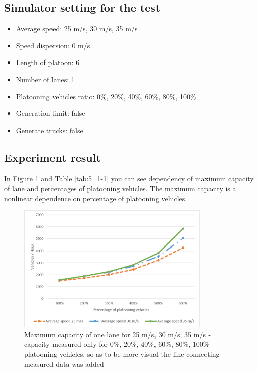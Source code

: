 \subsection*{Simulator setting for the test}
\begin{itemize}
\item Average speed: 25 m/s, 30 m/s, 35 m/s
\item Speed dispersion: 0 m/s
\item Length of platoon: 6
\item Number of lanes:  1
\item Platooning vehicles ratio: 0\%, 20\%, 40\%, 60\%, 80\%, 100\%
\item Generation limit: false
\item Generate trucks: false
\end{itemize}



\subsection*{Experiment result}

In Figure \ref{fig:5_1-1} and Table \ref{tab:5_1-1} you can see dependency of maximum capacity of lane and percentages of platooning vehicles. The maximum capacity is a nonlinear dependence on percentage of platooning vehicles. 

\begin{figure}[ph]
\centering
\includegraphics[width=0.82\textwidth,height=0.82\textheight,keepaspectratio]{figures/Chapter_5/5_maximum_cap.png}
\centering
\protect\caption[Maximum capacity of one lane for 25 m/s, 30 m/s, 35 m/s]{\label{fig:5_1-1}Maximum capacity of one lane for 25 m/s, 30 m/s, 35 m/s - capacity measured only for 0\%, 20\%, 40\%, 60\%, 80\%, 100\% platooning vehicles, so as to be more visual the line connecting measured data was added}
\end{figure}

